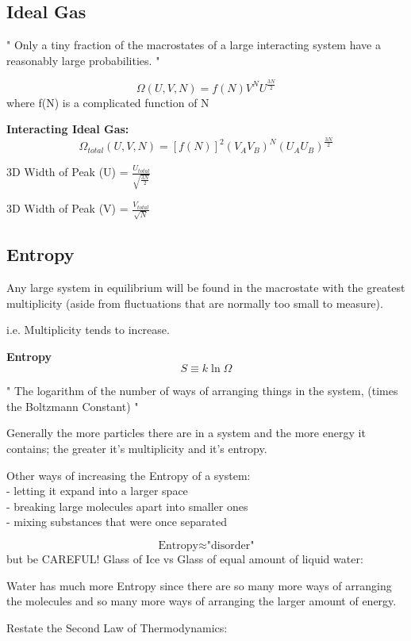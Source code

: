 \documentclass[11pt]{article}
\theoremstyle{definition}
\begin{document}
\subsection{Ideal Gas}
" Only a tiny fraction of the macrostates of a large interacting system have a reasonably large probabilities. "

\[ \Omega (U,V,N) = f(N) V^N U^{\frac{3N}{2}} \]
where f(N) is a complicated function of N

\textbf{Interacting Ideal Gas:}
\[ \Omega_{total} (U,V,N) = [f(N)]^2 (V_A V_B)^N (U_A U_B)^{\frac{3N}{2}} \]

3D Width of Peak (U) = $\frac{U_{total}}{\sqrt{\frac{3N}{2}}}$

3D Width of Peak (V) = $\frac{V_{total}}{\sqrt{N}}$

\subsection{Entropy}
Any large system in equilibrium will be found in the macrostate with the greatest multiplicity (aside from fluctuations that are normally too small to measure).

i.e. Multiplicity tends to increase.

\begin{shaded}
\textbf{Entropy}
\begin{equation}
    S \equiv k\ln\Omega
\end{equation}
\end{shaded}
" The logarithm of the number of ways of arranging things in the system, (times the Boltzmann Constant) "

Generally the more particles there are in a system and the more energy it contains; the greater it's multiplicity and it's entropy.

Other ways of increasing the Entropy of a system:\\
- letting it expand into a larger space \\
- breaking large molecules apart into smaller ones\\
- mixing substances that were once separated

\[ \text{Entropy} \approx \text{"disorder"} \]
but be CAREFUL! 
Glass of Ice vs Glass of equal amount of liquid water:

Water has much more Entropy since there are so many more ways of arranging the molecules and so many more ways of arranging the larger amount of energy.

Restate the Second Law of Thermodynamics:
\end{document}

